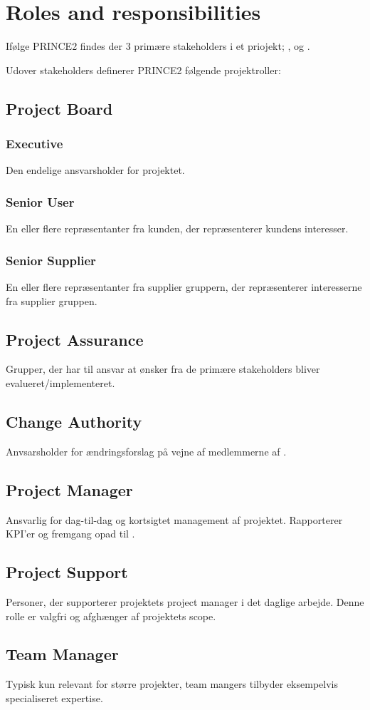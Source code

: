 \chapter{Roles and responsibilities}
Ifølge PRINCE2 findes der 3 primære stakeholders i et priojekt; ,  og .

Udover stakeholders definerer PRINCE2 følgende projektroller:

\section{Project Board}
\label{sec:project_board}

\subsection{Executive}
\label{sec:executive}
Den endelige ansvarsholder for projektet.

\subsection{Senior User}
En eller flere repræsentanter fra kunden, der repræsenterer kundens interesser.

\subsection{Senior Supplier}
En eller flere repræsentanter fra supplier gruppern, der repræsenterer interesserne fra supplier gruppen.

\section{Project Assurance}
Grupper, der har til ansvar at ønsker fra de primære stakeholders bliver evalueret/implementeret.

\section{Change Authority}
Anvsarsholder for ændringsforslag på vejne af medlemmerne af .

\section{Project Manager}
Ansvarlig for dag-til-dag og kortsigtet management af projektet. Rapporterer KPI'er og fremgang opad til .

\section{Project Support}
Personer, der supporterer projektets project manager i det daglige arbejde. Denne rolle er valgfri og afghænger af projektets scope.

\section{Team Manager}
Typisk kun relevant for større projekter, team mangers tilbyder eksempelvis specialiseret expertise.
